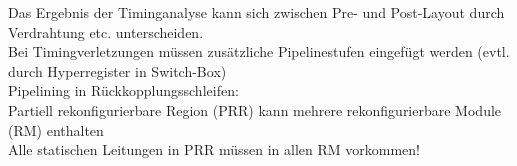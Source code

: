 \documentclass[english]{latex4ei/latex4ei_sheet}
\begin{document}
Das Ergebnis der Timinganalyse kann sich zwischen Pre- und Post-Layout durch Verdrahtung etc. unterscheiden.\\
Bei Timingverletzungen müssen zusätzliche Pipelinestufen eingefügt werden (evtl. durch Hyperregister in Switch-Box)\\
Pipelining in Rückkopplungsschleifen:\\

Partiell rekonfigurierbare Region (PRR) kann mehrere rekonfigurierbare Module (RM) enthalten\\
Alle statischen Leitungen in PRR müssen in allen RM vorkommen!\\





\end{document}

